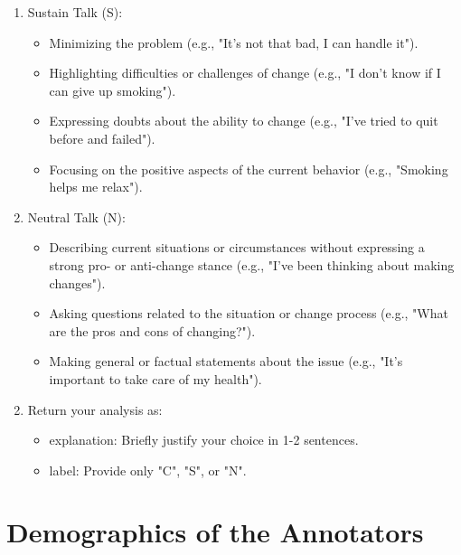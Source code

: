\begin{tcolorbox}
\begin{enumerate}[itemsep=0pt, parsep=0pt]
\begin{enumerate}[leftmargin=2em]
        \item Sustain Talk (S):
        \begin{itemize}[itemsep=0pt, parsep=0pt]
            \item Minimizing the problem (e.g., "It's not that bad, I can handle it").
            \item Highlighting difficulties or challenges of change (e.g., "I don't know if I can give up smoking").
            \item Expressing doubts about the ability to change (e.g., "I've tried to quit before and failed").
            \item Focusing on the positive aspects of the current behavior (e.g., "Smoking helps me relax").
        \end{itemize}

        \item Neutral Talk (N):
        \begin{itemize}[itemsep=0pt, parsep=0pt]
            \item Describing current situations or circumstances without expressing a strong pro- or anti-change stance (e.g., "I've been thinking about making changes").
            \item Asking questions related to the situation or change process (e.g., "What are the pros and cons of changing?").
            \item Making general or factual statements about the issue (e.g., "It's important to take care of my health").
        \end{itemize}
    \end{enumerate}
\end{enumerate}

\clearpage

\begin{enumerate}[itemsep=0pt, parsep=0pt]
    \setcounter{enumi}{1}
    \item Return your analysis as:
    \begin{itemize}
        \item explanation: Briefly justify your choice in 1-2 sentences.
        \item label: Provide only "C", "S", or "N".
    \end{itemize}
\end{enumerate}

\end{tcolorbox}
\vspace{1em}
\section*{Demographics of the Annotators}

